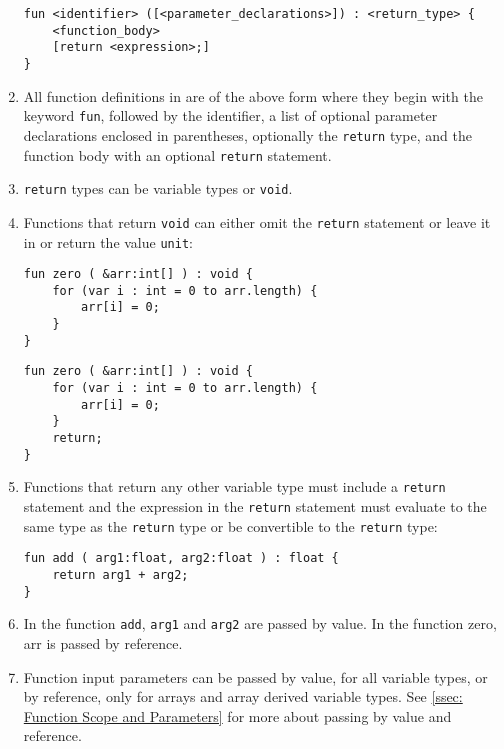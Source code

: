 \begin{enumerate}
\begin{lstlisting}[numbers=none]
fun <identifier> ([<parameter_declarations>]) : <return_type> { 
	<function_body> 
	[return <expression>;] 
}
\end{lstlisting}
	\item All function definitions in \lepix{} are of the above form where they begin with the keyword \lstinline|fun|, followed by the identifier, a list of optional parameter declarations enclosed in parentheses, optionally the \lstinline|return| type, and the function body with an optional \lstinline|return| statement.
	\item \lstinline|return| types can be variable types or \lstinline|void|. 
	\item Functions that return \lstinline|void| can either omit the \lstinline|return| statement or leave it in or return the value \lstinline|unit|:
\begin{lstlisting}[numbers=none]
fun zero ( &arr:int[] ) : void {
	for (var i : int = 0 to arr.length) {
		arr[i] = 0;
	}
}
\end{lstlisting}
\begin{lstlisting}[numbers=none]
fun zero ( &arr:int[] ) : void {
	for (var i : int = 0 to arr.length) {
		arr[i] = 0;
	}
	return;
}
\end{lstlisting}
	\item Functions that return any other variable type must include a \lstinline|return| statement and the expression in the \lstinline|return| statement must evaluate to the same type as the \lstinline|return| type or be convertible to the \lstinline|return| type:
\begin{lstlisting}[numbers=none]
fun add ( arg1:float, arg2:float ) : float {
	return arg1 + arg2;
}
\end{lstlisting}
	\item In the function \lstinline|add|, \lstinline|arg1| and \lstinline|arg2| are passed by value. In the function zero, arr is passed by reference.
	\item Function input parameters can be passed by value, for all variable types, or by reference, only for arrays and array derived variable types. See \ref{ssec: Function Scope and Parameters} for more about passing by value and reference.
\end{enumerate}

